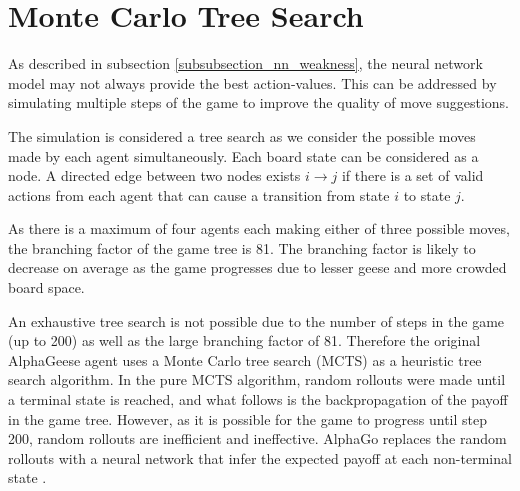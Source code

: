 \section{Monte Carlo Tree Search}
\label{section_mcts}

As described in subsection \ref{subsubsection_nn_weakness}, the neural network model may not always provide the best action-values. This can be addressed by simulating multiple steps of the game to improve the quality of move suggestions.

The simulation is considered a tree search as we consider the possible moves made by each agent simultaneously. Each board state can be considered as a node. A directed edge between two nodes exists $i \to j$ if there is a set of valid actions from each agent that can cause a transition from state $i$ to state $j$.

As there is a maximum of four agents each making either of three possible moves, the branching factor of the game tree is 81. The branching factor is likely to decrease on average as the game progresses due to lesser geese and more crowded board space.

An exhaustive tree search is not possible due to the number of steps in the game (up to 200) as well as the large branching factor of 81. Therefore the original AlphaGeese agent uses a Monte Carlo tree search (MCTS) as a heuristic tree search algorithm. In the pure MCTS algorithm, random rollouts were made until a terminal state is reached, and what follows is the backpropagation of the payoff in the game tree. However, as it is possible for the game to progress until step 200, random rollouts are inefficient and ineffective. AlphaGo replaces the random rollouts with a neural network that infer the expected payoff at each non-terminal state \cite{blog_alphago_tutorial}. 



